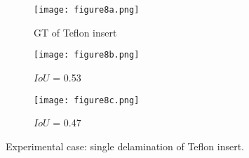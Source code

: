 \begin{figure} [!h]
	\centering
	\begin{subfigure}[b]{0.32\textwidth}
		\centering
		\texttt{[image: figure8a.png]}
		\caption{\centering GT of Teflon insert}
		\label{fig:exp_CFRP_teflon_3o_GT}
	\end{subfigure}
	\hfill
	\begin{subfigure}[b]{0.32\textwidth}
		\centering
		\texttt{[image: figure8b.png]}
		\caption{\centering \(IoU\) = 0.53 } 
		\label{fig:model_1_CFRP_teflon_3o}
	\end{subfigure}
	\hfill
	\begin{subfigure}[b]{0.32\textwidth}
		\centering
		\texttt{[image: figure8c.png]}
		\caption{\centering \(IoU\) = 0.47}
		\label{fig:model_2_CFRP_teflon_3o}
	\end{subfigure}
	\caption{Experimental case: single delamination of Teflon insert.}
	\label{fig:exp_Teflon_insert}
\end{figure} 

